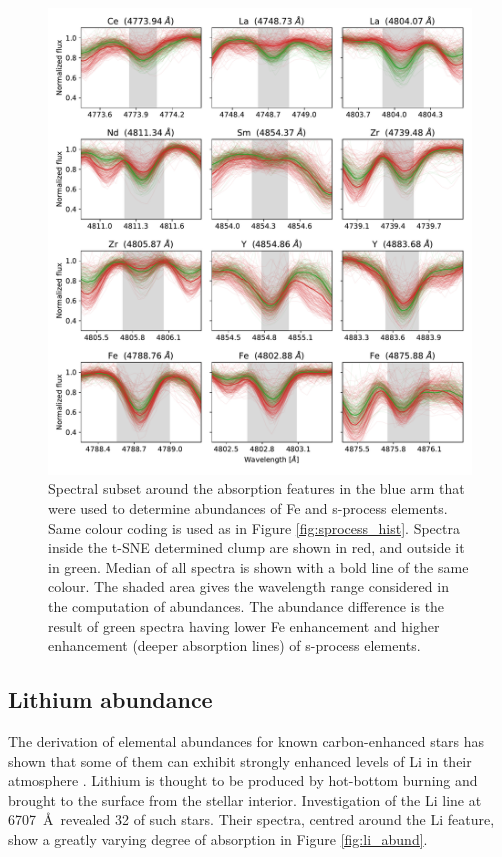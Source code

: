 \begin{figure}
	\centering
	\includegraphics[width=\textwidth]{sprocess_spectra.pdf}
	\caption{Spectral subset around the absorption features in the blue arm that were used to determine abundances of Fe and s-process elements. Same colour coding is used as in Figure \ref{fig:sprocess_hist}. Spectra inside the t-SNE determined clump are shown in red, and outside it in green. Median of all spectra is shown with a bold line of the same colour. The shaded area gives the wavelength range considered in the computation of abundances. The abundance difference is the result of green spectra having lower Fe enhancement and higher enhancement (deeper absorption lines) of s-process elements.}
	\label{fig:sprocess_spectrum}
\end{figure} 

\subsection{Lithium abundance}
\label{sec:lithium}
The derivation of elemental abundances for known carbon-enhanced stars has shown that some of them can exhibit strongly enhanced levels of Li in their atmosphere \cite{1991A&A...245L...1A}. Lithium is thought to be produced by hot-bottom burning \cite{1974ApJ...187..555S} and brought to the surface from the stellar interior. Investigation of the Li line at 6707~\AA\ revealed 32 of such stars. Their spectra, centred around the Li feature, show a greatly varying degree of absorption in Figure \ref{fig:li_abund}.

